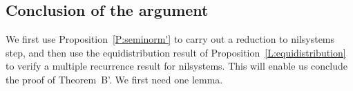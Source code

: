 \documentclass[11pt]{amsart}
\newcommand{\N}{\mathbb{N}}
\theoremstyle{plain}
\newtheorem{lemma}[theorem]{Lemma}
\theoremstyle{definition}
\theoremstyle{remark}
\begin{document}
\subsection{Conclusion of the argument} \label{SS:warmupconclusion} We
first  use Proposition~\ref{P:seminorm'} to carry out a reduction to
nilsystems step, and then use the equidistribution result of
Proposition~\ref{L:equidistribution} to verify a multiple recurrence
result for nilsystems. This will enable us  conclude the proof of
Theorem~B'. We first need one   lemma.

\end{document}
